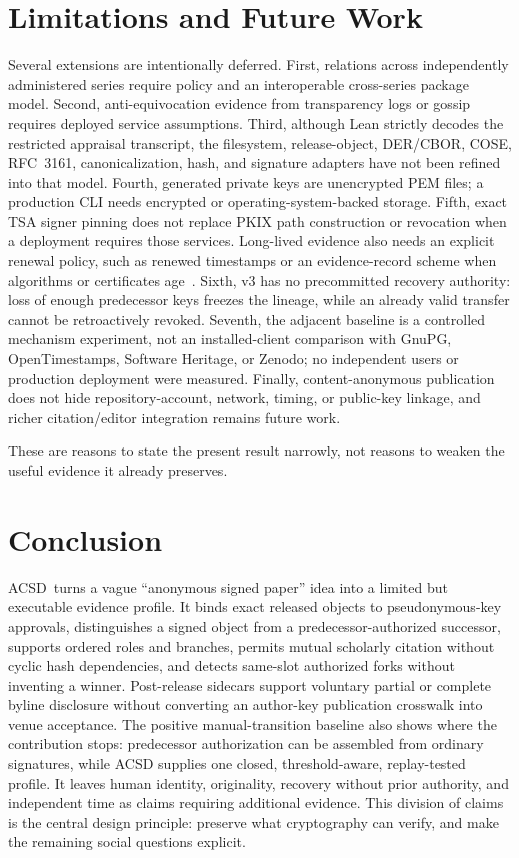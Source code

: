 \documentclass[11pt]{article}
\newcommand{\acsd}{\textsc{ACSD}}
\begin{document}
\section{Limitations and Future Work}

Several extensions are intentionally deferred. First, relations across independently administered series require policy and an interoperable cross-series package model. Second, anti-equivocation evidence from transparency logs or gossip requires deployed service assumptions. Third, although Lean strictly decodes the restricted appraisal transcript, the filesystem, release-object, DER/CBOR, COSE, RFC~3161, canonicalization, hash, and signature adapters have not been refined into that model. Fourth, generated private keys are unencrypted PEM files; a production CLI needs encrypted or operating-system-backed storage. Fifth, exact TSA signer pinning does not replace PKIX path construction or revocation when a deployment requires those services. Long-lived evidence also needs an explicit renewal policy, such as renewed timestamps or an evidence-record scheme when algorithms or certificates age~\cite{ers}. Sixth, v3 has no precommitted recovery authority: loss of enough predecessor keys freezes the lineage, while an already valid transfer cannot be retroactively revoked. Seventh, the adjacent baseline is a controlled mechanism experiment, not an installed-client comparison with GnuPG, OpenTimestamps, Software Heritage, or Zenodo; no independent users or production deployment were measured. Finally, content-anonymous publication does not hide repository-account, network, timing, or public-key linkage, and richer citation/editor integration remains future work.

These are reasons to state the present result narrowly, not reasons to weaken the useful evidence it already preserves.

\section{Conclusion}

\acsd\ turns a vague ``anonymous signed paper'' idea into a limited but executable evidence profile. It binds exact released objects to pseudonymous-key approvals, distinguishes a signed object from a predecessor-authorized successor, supports ordered roles and branches, permits mutual scholarly citation without cyclic hash dependencies, and detects same-slot authorized forks without inventing a winner. Post-release sidecars support voluntary partial or complete byline disclosure without converting an author-key publication crosswalk into venue acceptance. The positive manual-transition baseline also shows where the contribution stops: predecessor authorization can be assembled from ordinary signatures, while ACSD supplies one closed, threshold-aware, replay-tested profile. It leaves human identity, originality, recovery without prior authority, and independent time as claims requiring additional evidence. This division of claims is the central design principle: preserve what cryptography can verify, and make the remaining social questions explicit.
\end{document}
